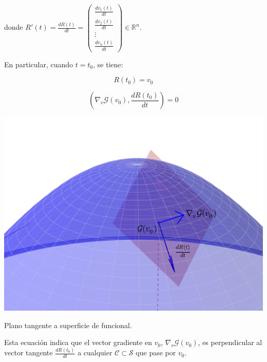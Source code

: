                 donde $R'(t) = \frac{dR(t)}{dt} = \begin{pmatrix} \frac{d v_1(t)}{dt} \\ \frac{d v_2(t)}{dt} \\ \vdots \\ \frac{d v_n(t)}{dt} \end{pmatrix} \in \mathbb{R}^n$.

                En particular, cuando $t = t_0$, se tiene:

                \begin{equation*}
                    R(t_0) = v_0
                \end{equation*}

                \begin{equation*}
                    \left( \nabla_v \mathscr{G}(v_0), \frac{dR(t_0)}{dt} \right) = 0
                \end{equation*}

                \begin{marginfigure}
                    \centering
                    \includegraphics[width=\textwidth]{./imagenes/superficie3dplano.pdf}
                    \caption{\label{fig:supplano}Plano tangente a superficie de funcional.}
                \end{marginfigure}

                Esta ecuación indica que el vector gradiente en $v_0$, $\nabla_v \mathscr{G}(v_0)$, es perpendicular al vector tangente $\frac{dR(t_0)}{dt}$ a cualquier $\mathscr{C} \subset \mathscr{S}$ que pase por $v_0$.

